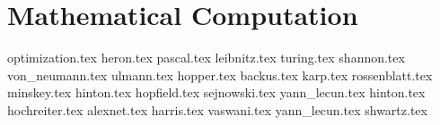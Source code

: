 \part{Mathematical Computation}
{optimization.tex}
{heron.tex}
{pascal.tex}
{leibnitz.tex}
{turing.tex}
{shannon.tex}
{von_neumann.tex}
{ulmann.tex}
{hopper.tex}
{backus.tex}
{karp.tex}
{rossenblatt.tex}
{minskey.tex}
{hinton.tex}
{hopfield.tex}
{sejnowski.tex}
{yann_lecun.tex}
{hinton.tex}
{hochreiter.tex}
{alexnet.tex}
{harris.tex}
{vaswani.tex}
{yann_lecun.tex}
{shwartz.tex}